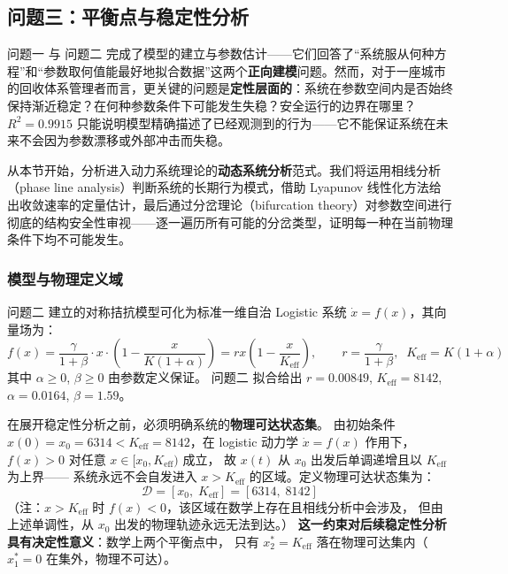 \documentclass[12pt,a4paper]{ctexart}
\begin{document}
\subsection{问题三：平衡点与稳定性分析}

问题一 与 问题二 完成了模型的建立与参数估计——它们回答了``系统服从何种方程''和``参数取何值能最好地拟合数据''这两个\textbf{正向建模}问题。然而，对于一座城市的回收体系管理者而言，更关键的问题是\textbf{定性层面的}：系统在参数空间内是否始终保持渐近稳定？在何种参数条件下可能发生失稳？安全运行的边界在哪里？$R^2 = 0.9915$ 只能说明模型精确描述了已经观测到的行为——它不能保证系统在未来不会因为参数漂移或外部冲击而失稳。

从本节开始，分析进入动力系统理论的\textbf{动态系统分析}范式。我们将运用相线分析（phase line analysis）判断系统的长期行为模式，借助 Lyapunov 线性化方法给出收敛速率的定量估计，最后通过分岔理论（bifurcation theory）对参数空间进行彻底的结构安全性审视——逐一遍历所有可能的分岔类型，证明每一种在当前物理条件下均不可能发生。

\subsubsection{模型与物理定义域}

问题二 建立的对称拮抗模型可化为标准一维自治 Logistic 系统
$\dot{x} = f(x)$，其向量场为：
\begin{equation}\label{eq:ode_q3}
f(x) = \frac{\gamma}{1+\beta} \cdot x \cdot \left(1 - \frac{x}{K(1+\alpha)}\right)
     = r x \left(1 - \frac{x}{K_{\text{eff}}}\right), \qquad
r = \frac{\gamma}{1+\beta},\;\; K_{\text{eff}} = K(1+\alpha)
\end{equation}
其中 $\alpha \geq 0$, $\beta \geq 0$ 由参数定义保证。
问题二 拟合给出 $r = 0.00849$, $K_{\text{eff}} = 8142$,
$\alpha = 0.0164$, $\beta = 1.59$。

在展开稳定性分析之前，必须明确系统的\textbf{物理可达状态集}。
由初始条件 $x(0) = x_0 = 6314 < K_{\text{eff}} = 8142$，在 logistic 动力学
$\dot{x} = f(x)$ 作用下，$f(x) > 0$ 对任意 $x \in [x_0, K_{\text{eff}})$ 成立，
故 $x(t)$ 从 $x_0$ 出发后单调递增且以 $K_{\text{eff}}$ 为上界——
系统永远不会自发进入 $x > K_{\text{eff}}$ 的区域。定义物理可达状态集为：
\begin{equation}
\mathcal{D} = [x_0,\; K_{\text{eff}}] = [6314,\; 8142]
\end{equation}
（注：$x > K_{\text{eff}}$ 时 $f(x) < 0$，该区域在数学上存在且相线分析中会涉及，
但由上述单调性，从 $x_0$ 出发的物理轨迹永远无法到达。）
\textbf{这一约束对后续稳定性分析具有决定性意义}：数学上两个平衡点中，
只有 $x^*_2 = K_{\text{eff}}$ 落在物理可达集内（$x^*_1 = 0$ 在集外，物理不可达）。
\end{document}
